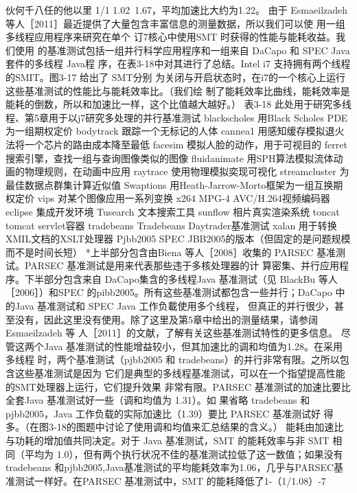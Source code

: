 伙何千八任的他以里
1/1
1.02~1.67，平均加速比大约为1.22。
由于 Esmaeilzadeh 等人［2011］最近提供了大量包含丰富信息的测量数据，所以我们可以使
用一组多线程应用程序来研究在单个 订7核心中使用SMT 时获得的性能与能耗收益。我们使用
的基准测试包括一组并行科学应用程序和一组来自 DaCapo 和 SPEC Java套件的多线程 Java程
序，在表3-18中对其进行了总结。Intel i7 支持拥有两个线程的SMIT。图3-17 给出了 SMT分别
为关闭与开启状态时，在i7的一个核心上运行这些基准测试的性能比与能耗效率比。（我们绘
制了能耗效率比曲线，能耗效率是能耗的倒数，所以和加速比一样，这个比值越大越好。）
表3-18 此处用于研究多线程、第5章用于以j7研究多处理的并行基准测试
blackscholes
用Black Scholes PDE为一组期权定价
bodytrack
跟踪一个无标记的人体
cannea1
用感知缓存模拟退火法将一个芯片的路由成本降至最低
facesim
模拟人脸的动作，用于可视目的
ferret
搜索引擎，查找一组与查询图像类似的图像
fluidanimate
用SPH算法模拟流体动画的物理规则，在动画中应用
raytrace
使用物理模拟奕现可视化
streamcluster
为最佳数据点群集计算近似值
Swaptions
用Heath-Jarrow-Morto框架为一组互换期权定价
vips
对某个图像应用一系列变换
x264
MPG-4 AVC/H.264视频编码器
eclipse
集成开发环境
Tusearch
文本搜索工具
sunflow
相片真实渲染系统
toncat
tomcat servlet容器
tradebeans
Tradebeans Daytrader基准测试
xalan
用于转换XMIL文档的XSLT处理器
Pjbb2005
SPEC JBB2005的版本（但固定的是问题规模而不是时间长短）
*上半部分包含由Biena 等人［2008］收集的 PARSEC 基准测试。PARSEC 基准测试是用来代表那些违于多核处理器的计
算密集、并行应用程序。下半部分包含来自 DaCapo集含的多线程Java 基准测试（见 BlackBu 等人［2006］）和SPEC
的pibb2005。所有这些基准测试都包含一些并行；DaCapo 中的Java 基准测试和 SPEC Java 工作负載使用多个线程，
但真正的并行很少，甚至没有，因此这里没有使用。除了这里及第5章中给出的测量结果，请参阔 Esmaeilzadeh 等
人［2011］的文献，了解有关这些基准测试特性的更多信息。
尽管这两个Java 基准测试的性能增益较小，但其加速比的调和均值为1.28。在采用多线程
时，两个基准测试（pjbb2005 和 tradebeans）的并行非常有限。之所以包含这些基准测试是因为
它们是典型的多线程基准测试，可以在一个指望提高性能的SMT处理器上运行，它们提升效果
非常有限。PARSEC 基准测试的加速比要比全套Java 基准测试好一些（调和均值为 1.31）。如
果省略 tradebeans 和 pjbb2005，Java 工作负载的实际加速比（1.39）要比 PARSEC 基准测试好
得多。（在图3-18的图题中讨论了使用调和均值来汇总结果的含义。）
能耗由加速比与功耗的增加值共同决定。对于 Java 基准测试，SMT 的能耗效率与非 SMT
相同（平均为 1.0），但有两个执行状况不佳的基准测试拉低了这一数值；如果没有 tradebeans
和pjbb2005,Java基准测试的平均能耗效率为1.06，几乎与PARSEC基准测试一样好。在PARSEC
基准测试中，SMT 的能耗降低了1-（1/1.08）-7%
